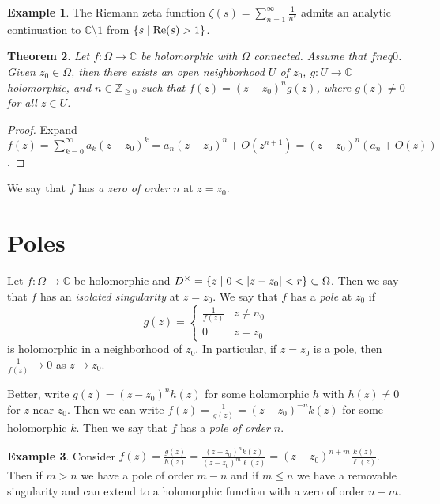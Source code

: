 \documentclass[leqno, openany]{memoir}
\newtheorem{thm}{Theorem}[section]
\theoremstyle{definition}
\newtheorem{exm}[thm]{Example}
\theoremstyle{remark}
\theoremstyle{plain}
\theoremstyle{definition}
\theoremstyle{remark}
\newcommand{\C}{\mathbb{C}}
\newcommand{\Z}{\mathbb{Z}}
\begin{document}
\begin{exm}
    The Riemann zeta function $\zeta(s) = \sum_{n=1}^{\infty} \frac{1}{n^s}$ admits an analytic continuation to $\C \setminus \qty{1}$ from $\qty{s \mid \Re(s) > 1}$.
\end{exm}

\begin{thm}
    Let $f \colon \Omega \to \C$ be holomorphic with $\Omega$ connected. Assume that $f neq 0$. Given $z_0 \in \Omega$, then there exists an open neighborhood $U$ of $z_0$, $g \colon U \to \C$ holomorphic, and $n \in \Z_{\geq 0}$ such that $f(z) = {(z-z_0)}^n g(z)$, where $g(z) \neq 0$ for all $z \in U$.
\end{thm}

\begin{proof}
    Expand $f(z) = \sum_{k=0}^{\infty} a_k {(z-z_0)}^k = a_n{(z-z_0)}^n + O(z^{n+1}) = {(z-z_0)}^n (a_n + O(z))$.
\end{proof}

We say that $f$ has \textit{a zero of order $n$} at $z=z_0$.

\section{Poles}%
\label{sec:poles}

Let $f \colon \Omega \to \C$ be holomorphic and $D^{\times} = \qty{z \mid 0 < \abs{z-z_0}<r} \subset \Omega$. Then we say that $f$ has an \textit{isolated singularity} at $z = z_0$. We say that $f$ has a \textit{pole} at $z_0$ if
\[ g(z) = \begin{cases}
    \frac{1}{f(z)} & z \neq n_0 \\
    0 & z = z_0
\end{cases} \]
is holomorphic in a neighborhood of $z_0$. In particular, if $z = z_0$ is a pole, then $\frac{1}{f(z)} \to 0$ as $z \to z_0$.

Better, write $g(z) = {(z-z_0)}^n h(z)$ for some holomorphic $h$ with $h(z) \neq 0$ for $z$ near $z_0$. Then we can write $f(z) = \frac{1}{g(z)} = {(z-z_0)}^{-n} k(z)$ for some holomorphic $k$. Then we say that $f$ has a \textit{pole of order $n$}.

\begin{exm}
    Consider $f(z) = \frac{g(z)}{h(z)} = \frac{{(z-z_0)}^n k(z)}{{(z-z_0)}^m \ell(z)} = {(z-z_0)}^{n+m} \frac{k(z)}{\ell(z)}$. Then if $m > n$ we have a pole of order $m-n$ and if $m \leq n$ we have a removable singularity and can extend to a holomorphic function with a zero of order $n-m$.
\end{exm}
\end{document}
